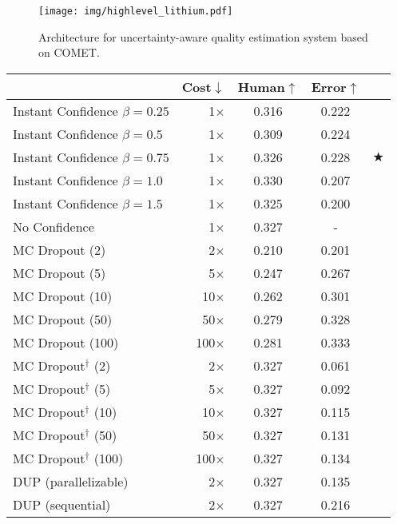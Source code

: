 \begin{figure}[t]
    \centering
    \texttt{[image: img/highlevel\_lithium.pdf]}
    \caption{Architecture for uncertainty-aware quality estimation system based on COMET.}
    \label{fig:highlevel_lithium}
\end{figure}

\begin{table}[t]
\small
\centering
\begin{tabular}{l@{\hspace{1mm}}r@{\hspace{1mm}}c@{\hspace{2mm}}c@{}l@{}}
\toprule
& \bf Cost$\bm{\downarrow}$ & \bf Human$\bm{\uparrow}$ & \bf Error$\bm{\uparrow}$  \\
\midrule
Instant Confidence $\beta{=}0.25$\hspace{-2mm} & 1$\times$ & 0.316 & 0.222 \\
Instant Confidence $\beta{=}0.5$\hspace{-2mm} & 1$\times$ & 0.309 & 0.224 \\
Instant Confidence $\beta{=}0.75$\hspace{-2mm} & 1$\times$ & 0.326 & 0.228 & $\bigstar$ \\
Instant Confidence $\beta{=}1.0$\hspace{-2mm} & 1$\times$ & 0.330 & 0.207 \\
Instant Confidence $\beta{=}1.5$\hspace{-2mm} & 1$\times$ & 0.325 & 0.200 \\[0.5em]
No Confidence & 1$\times$ & 0.327 & - \\[0.5em]

MC Dropout (2) & 2$\times$ & 0.210 & 0.201 \\
MC Dropout (5) & 5$\times$ & 0.247 & 0.267 \\
MC Dropout (10) & 10$\times$ & 0.262 & 0.301 \\
MC Dropout (50) & 50$\times$ & 0.279 & 0.328 \\
MC Dropout (100) & 100$\times$ & 0.281 & 0.333 \\[0.5em]
MC Dropout$^\dagger$ (2) & 2$\times$ & 0.327 & 0.061 \\
MC Dropout$^\dagger$ (5) & 5$\times$ & 0.327 & 0.092 \\
MC Dropout$^\dagger$ (10) & 10$\times$ & 0.327 & 0.115 \\
MC Dropout$^\dagger$ (50) & 50$\times$ & 0.327 & 0.131 \\
MC Dropout$^\dagger$ (100) & 100$\times$ & 0.327 & 0.134 \\[0.5em]
DUP (parallelizable) & 2$\times$ & 0.327 & 0.135 \\  
DUP (sequential) & 2$\times$ & 0.327 & 0.216 \\
\bottomrule


\end{tabular}
\end{table}
